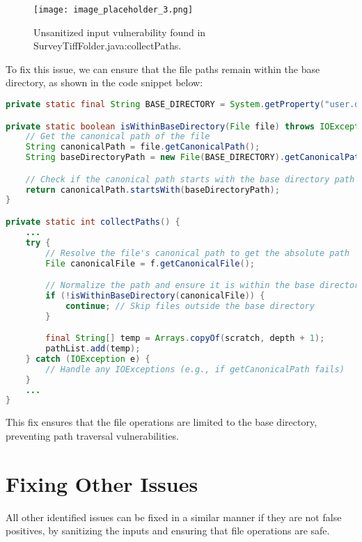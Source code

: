 \documentclass[a4paper,12pt]{report}
\begin{document}
\begin{figure}[H]
    \centering
    \texttt{[image: image\_placeholder\_3.png]} %
    \caption{Unsanitized input vulnerability found in SurveyTiffFolder.java:collectPaths.}
    \label{fig:unsanitized-input}
\end{figure}

To fix this issue, we can ensure that the file paths remain within the base directory, as shown in the code snippet below:

\begin{lstlisting}[language=java, caption=SurveyTiffFolder.java:collectPath.class fix]
private static final String BASE_DIRECTORY = System.getProperty("user.dir");

private static boolean isWithinBaseDirectory(File file) throws IOException {
    // Get the canonical path of the file
    String canonicalPath = file.getCanonicalPath();
    String baseDirectoryPath = new File(BASE_DIRECTORY).getCanonicalPath();

    // Check if the canonical path starts with the base directory path
    return canonicalPath.startsWith(baseDirectoryPath);
}

private static int collectPaths() {
    ...
    try {
        // Resolve the file's canonical path to get the absolute path
        File canonicalFile = f.getCanonicalFile();

        // Normalize the path and ensure it is within the base directory
        if (!isWithinBaseDirectory(canonicalFile)) {
            continue; // Skip files outside the base directory
        }

        final String[] temp = Arrays.copyOf(scratch, depth + 1);
        pathList.add(temp);
    } catch (IOException e) {
        // Handle any IOExceptions (e.g., if getCanonicalPath fails)
    }
    ...
}
\end{lstlisting}

This fix ensures that the file operations are limited to the base directory, preventing path traversal vulnerabilities. 

\section{Fixing Other Issues}
All other identified issues can be fixed in a similar manner if they are not false positives, by sanitizing the inputs and ensuring that file operations are safe.

\newpage
\end{document}
